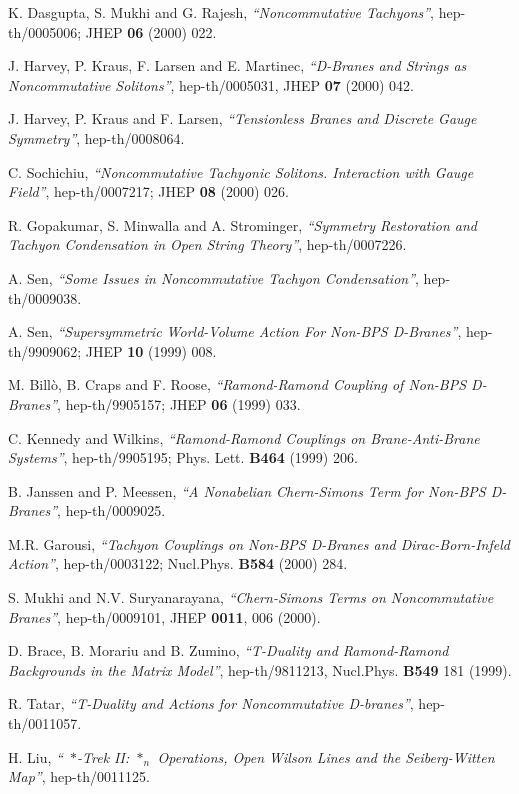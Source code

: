 \documentclass[a4paper,a4paper]{amsproc}
\theoremstyle{definition}
\theoremstyle{remark}
\numberwithin{equation}{section}
\begin{document}
\begin{thebibliography}{A}
 K. Dasgupta, S. Mukhi and G. Rajesh,
\textit{``Noncommutative Tachyons''}, hep-th/0005006; JHEP {\bf 06}
(2000) 022.

 J. Harvey, P. Kraus, F. Larsen and E. Martinec,
\textit{``D-Branes and Strings as Noncommutative Solitons''},
hep-th/0005031, JHEP {\bf 07} (2000) 042.

 J. Harvey, P. Kraus and F. Larsen, \textit{``Tensionless
Branes and Discrete Gauge Symmetry''}, hep-th/0008064.

 C. Sochichiu, \textit{``Noncommutative Tachyonic
Solitons. Interaction with Gauge Field''}, hep-th/0007217; JHEP {\bf
08} (2000) 026.

 R. Gopakumar, S. Minwalla and A. Strominger,
\textit{``Symmetry Restoration and Tachyon Condensation in Open String
Theory''}, hep-th/0007226.

 A. Sen, \textit{``Some Issues in Noncommutative
Tachyon Condensation''}, hep-th/0009038.

 A. Sen, \textit{``Supersymmetric World-Volume Action
For Non-BPS D-Branes''}, hep-th/9909062; JHEP {\bf 10} (1999) 008.

 M. Bill\`o, B. Craps and F. Roose,
\textit{``Ramond-Ramond Coupling of Non-BPS D-Branes''},
hep-th/9905157; JHEP {\bf 06} (1999) 033.

 C. Kennedy and Wilkins, \textit{``Ramond-Ramond
Couplings on Brane-Anti-Brane Systems''}, hep-th/9905195;
Phys. Lett. {\bf B464} (1999) 206.

 B. Janssen and P. Meessen, \textit{``A Nonabelian
Chern-Simons Term for Non-BPS D-Branes''}, hep-th/0009025.

 M.R. Garousi, \textit{``Tachyon Couplings on Non-BPS
D-Branes and Dirac-Born-Infeld Action''}, hep-th/0003122;
Nucl.Phys. {\bf B584} (2000) 284.

 S. Mukhi and N.V. Suryanarayana, \textit{``Chern-Simons 
Terms on Noncommutative Branes''}, hep-th/0009101, 
JHEP {\bf 0011}, 006 (2000).

 D. Brace, B. Morariu and B. Zumino,
\textit{``T-Duality and Ramond-Ramond Backgrounds in the 
Matrix Model''}, hep-th/9811213,
Nucl.Phys. {\bf B549} 181 (1999).

 R. Tatar, \textit{``T-Duality and Actions for
Noncommutative D-branes''}, hep-th/0011057.

 H. Liu, \textit{``~$*$-Trek II: $*_n$ Operations, Open
Wilson Lines and the Seiberg-Witten Map''}, hep-th/0011125.


\end{thebibliography}
\end{document}
